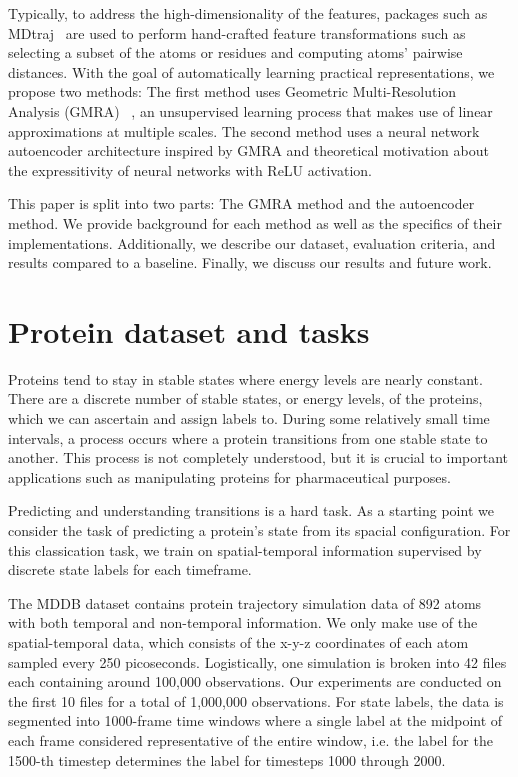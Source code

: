 \documentclass{article}
\begin{document}
Typically, to address the high-dimensionality of the features, packages such as MDtraj~\cite{McGibbon2015MDTraj} are used to perform hand-crafted feature transformations such as selecting a subset of the atoms or residues and computing atoms' pairwise distances. With the goal of automatically learning practical representations, we propose two methods: The first method uses Geometric Multi-Resolution Analysis (GMRA) ~\cite{allard2012multi}, an unsupervised learning process that makes use of linear approximations at multiple scales. The second method uses a neural network autoencoder architecture inspired by GMRA and theoretical motivation about the expressitivity of neural networks with ReLU activation.

This paper is split into two parts: The GMRA method and the autoencoder method. We provide background for each method as well as the specifics of their implementations. Additionally, we describe our dataset, evaluation criteria, and results compared to a baseline. Finally, we discuss our results and future work.

\section{Protein dataset and tasks}
Proteins tend to stay in stable states where energy levels are nearly constant. There are a discrete number of stable states, or energy levels, of the proteins, which we can ascertain and assign labels to. During some relatively small time intervals, a process occurs where a protein transitions from one stable state to another. This process is not completely understood, but it is crucial to important applications such as manipulating proteins for pharmaceutical purposes.

Predicting and understanding transitions is a hard task. As a starting point we consider the task of predicting a protein's state from its spacial configuration. For this classication task, we train on spatial-temporal information supervised by discrete state labels for each timeframe.

The MDDB dataset contains protein trajectory simulation data of 892 atoms with both temporal and non-temporal information. We only make use of the spatial-temporal data, which consists of the x-y-z coordinates of each atom sampled every 250 picoseconds. Logistically, one simulation is broken into 42 files each containing around 100,000 observations. Our experiments are conducted on the first 10 files for a total of 1,000,000 observations. For state labels, the data is segmented into 1000-frame time windows where a single label at the midpoint of each frame considered representative of the entire window, i.e. the label for the 1500-th timestep determines the label for timesteps 1000 through 2000.
\end{document}
